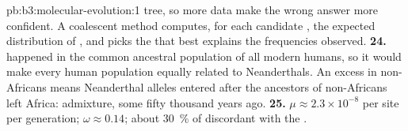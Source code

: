\begin{solution}{pb:b3:molecular-evolution:1}
{tree}, so more data make the wrong answer more confident. A coalescent
method computes, for each candidate , the expected
distribution of , and picks the  that best
explains the frequencies observed.
\textbf{24.}  happened in the common ancestral
population of all modern humans, so it would make every human
population equally related to Neanderthals. An excess in non-Africans
means Neanderthal alleles entered after the ancestors of non-Africans
left Africa: admixture, some fifty thousand years ago.
\textbf{25.} $\mu \approx 2.3\times 10^{-8}$ per site per generation;
$\omega \approx 0.14$; about \qty{30}{\%} of  discordant with
the .
\end{solution}
